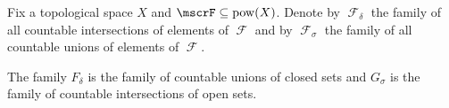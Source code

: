 \begin{definition}\label{def:borel_algebra}
  Fix a topological space \( X \) and \( \mscrF \subseteq \Pow(X) \). Denote by \( \mscrF_\delta \) the family of all countable intersections of elements of \( \mscrF \) and by \( \mscrF_\sigma \) the family of all countable unions of elements of \( \mscrF \).

  The family \( F_\delta \) is the family of countable unions of closed sets and \( G_\sigma \) is the family of countable intersections of open sets.
\end{definition}
